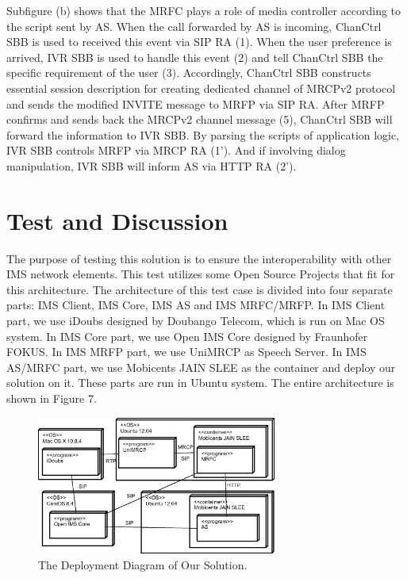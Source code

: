 \documentclass[10pt, conference, a4paper]{IEEEtran}
\begin{document}
Subfigure (b) shows that the MRFC plays a role of media controller according to the script sent by AS. When the call forwarded by AS is incoming, ChanCtrl SBB is used to received this event via SIP RA (1). When the user preference is arrived, IVR SBB is used to handle this event (2) and tell ChanCtrl SBB the specific requirement of the user (3). Accordingly, ChanCtrl SBB constructs essential session description for creating dedicated channel of MRCPv2 protocol and sends the modified INVITE message to MRFP via SIP RA. After MRFP confirms and sends back the MRCPv2 channel message (5), ChanCtrl SBB will forward the information to IVR SBB. By parsing the scripts of application logic, IVR SBB controls MRFP via MRCP RA (1'). And if involving dialog manipulation, IVR SBB will inform AS via HTTP RA (2').

\section{Test and Discussion}

The purpose of testing this solution is to ensure the interoperability with other IMS network elements. This test utilizes some Open Source Projects that fit for this architecture. The architecture of this test case is divided into four separate parts: IMS Client, IMS Core, IMS AS and IMS MRFC/MRFP. In IMS Client part, we use iDoubs designed by Doubango Telecom\cite{site:doubango}, which is run on Mac OS system. In IMS Core part, we use Open IMS Core designed by Fraunhofer FOKUS\cite{site:open.ims.core}. In IMS MRFP part, we use UniMRCP\cite{site:unimrcp} as Speech Server. In IMS AS/MRFC part, we use Mobicents JAIN SLEE\cite{site:mobicents.jain.slee} as the container and deploy our solution on it. These parts are run in Ubuntu system. The entire architecture is shown in Figure 7.

\begin{figure}[!t]
\centering
\includegraphics[width=3.1in]{deployment.eps}
\caption{The Deployment Diagram of Our Solution.}
\end{figure}
\end{document}
